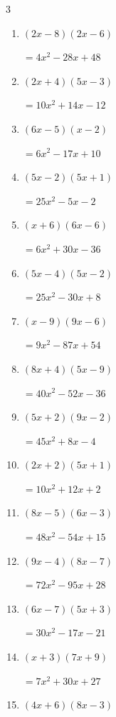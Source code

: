 \begin{multicols}{3}
\begin{enumerate}
        $=7x^{2}+72x+81$

\columnbreak %

  \item $(2x-8)(2x-6)$

        $=4x^{2}-28x+48$

  \item $(2x+4)(5x-3)$

        $=10x^{2}+14x-12$

  \item $(6x-5)(x-2)$

        $=6x^{2}-17x+10$

  \item $(5x-2)(5x+1)$

        $=25x^{2}-5x-2$

  \item $(x+6)(6x-6)$

        $=6x^{2}+30x-36$

  \item $(5x-4)(5x-2)$

        $=25x^{2}-30x+8$

  \item $(x-9)(9x-6)$

        $=9x^{2}-87x+54$

  \item $(8x+4)(5x-9)$

        $=40x^{2}-52x-36$

  \item $(5x+2)(9x-2)$

        $=45x^{2}+8x-4$

  \item $(2x+2)(5x+1)$

        $=10x^{2}+12x+2$

  \item $(8x-5)(6x-3)$

        $=48x^{2}-54x+15$

  \item $(9x-4)(8x-7)$

        $=72x^{2}-95x+28$

  \item $(6x-7)(5x+3)$

        $=30x^{2}-17x-21$

  \item $(x+3)(7x+9)$

        $=7x^{2}+30x+27$

  \item $(4x+6)(8x-3)$


\end{enumerate}
\end{multicols}
